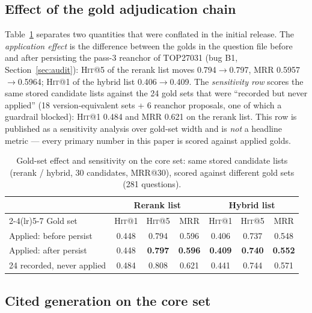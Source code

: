 \documentclass[10pt,a4paper,twocolumn]{article}
\newcommand{\hit}{\textsc{Hit}}
\begin{document}
\subsection{Effect of the gold adjudication chain}

Table~\ref{tab:gold-effect} separates two quantities that were conflated in the initial release. The \emph{application effect} is the difference between the golds in the question file before and after persisting the pass-3 reanchor of TOP27031 (bug B1, Section~\ref{sec:audit}): \hit{}@5 of the rerank list moves 0.794$\rightarrow$0.797, MRR 0.5957$\rightarrow$0.5964; \hit{}@1 of the hybrid list 0.406$\rightarrow$0.409. The \emph{sensitivity row} scores the same stored candidate lists against the 24 gold sets that were ``recorded but never applied'' (18 version-equivalent sets + 6 reanchor proposals, one of which a guardrail blocked): \hit{}@1 0.484 and MRR 0.621 on the rerank list. This row is published as a sensitivity analysis over gold-set width and is \emph{not} a headline metric --- every primary number in this paper is scored against applied golds.

\begin{table}[t]
\centering\scriptsize
\caption{Gold-set effect and sensitivity on the core set: same stored candidate lists (rerank / hybrid, 30 candidates, MRR@30), scored against different gold sets (281 questions).}
\label{tab:gold-effect}
\setlength{\tabcolsep}{2.4pt}
\begin{tabular}{lcccccc}
\toprule
 & \multicolumn{3}{c}{Rerank list} & \multicolumn{3}{c}{Hybrid list} \\
\cmidrule(lr){2-4}\cmidrule(lr){5-7}
Gold set & \hit{}@1 & \hit{}@5 & MRR & \hit{}@1 & \hit{}@5 & MRR \\
\midrule
Applied: before persist & 0.448 & 0.794 & 0.596 & 0.406 & 0.737 & 0.548 \\
Applied: after persist & 0.448 & \textbf{0.797} & \textbf{0.596} & \textbf{0.409} & \textbf{0.740} & \textbf{0.552} \\
\midrule
24 recorded, never applied & 0.484 & 0.808 & 0.621 & 0.441 & 0.744 & 0.571 \\
\bottomrule
\end{tabular}
\end{table}

\subsection{Cited generation on the core set}
\end{document}
